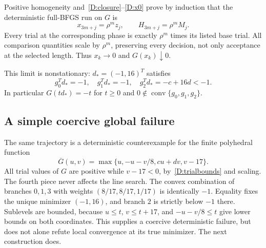 Positive homogeneity and~\eqref{D:closure}--\eqref{D:x0} prove by induction that the deterministic full-BFGS run on $G$ is
\[
 x_{3m+j}=\rho^m z_j,\qquad H_{3m+j}=\rho^m M_j.
\]
Every trial at the corresponding phase is exactly $\rho^m$ times its listed base trial. All comparison quantities scale by $\rho^m$, preserving every decision, not only acceptance at the selected length. Thus $x_k\to0$ and $G(x_k)\downarrow0$.

This limit is nonstationary: $d_* =(-1,16)^T$ satisfies
\[
 g_0^Td_*=-1,\quad g_1^Td_*=-1,\quad g_2^Td_*=-c+16d<-1.
\]
In particular $G(td_*)=-t$ for $t\ge0$ and $0\notin\operatorname{conv}\{g_0,g_1,g_2\}$.



\subsection{A simple coercive global failure}
The same trajectory is a deterministic counterexample for the finite polyhedral function
\[
 \overline G(u,v)=\max\{u,-u-v/8,cu+dv,v-17\}.
\]
All trial values of $G$ are positive while $v-17<0$, by~\eqref{D:trialbounds} and scaling. The fourth piece never affects the line search. The convex combination of branches $0,1,3$ with weights $(8/17,8/17,1/17)$ is identically $-1$. Equality fixes the unique minimizer $(-1,16)$, and branch $2$ is strictly below $-1$ there. Sublevels are bounded, because $u\le t$, $v\le t+17$, and $-u-v/8\le t$ give lower bounds on both coordinates. This supplies a coercive deterministic failure, but does not alone refute local convergence at its true minimizer. The next construction does.


\setcounter{section}{3}
\setcounter{theorem}{1}
\setcounter{lemma}{1}
\setcounter{corollary}{0}
\setcounter{proposition}{0}
\setcounter{remark}{0}
\setcounter{equation}{7}


